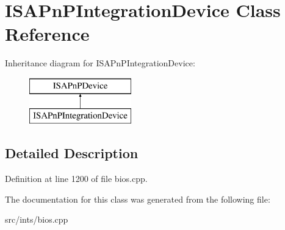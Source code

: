 \hypertarget{classISAPnPIntegrationDevice}{\section{I\-S\-A\-Pn\-P\-Integration\-Device Class Reference}
\label{classISAPnPIntegrationDevice}
}
Inheritance diagram for I\-S\-A\-Pn\-P\-Integration\-Device\-:\begin{figure}[H]
\begin{center}
\leavevmode
\includegraphics[height=2.000000cm]{classISAPnPIntegrationDevice}
\end{center}
\end{figure}


\subsection{Detailed Description}


Definition at line 1200 of file bios.\-cpp.



The documentation for this class was generated from the following file\-:\begin{DoxyCompactItemize}
\item 
src/ints/bios.\-cpp\end{DoxyCompactItemize}
